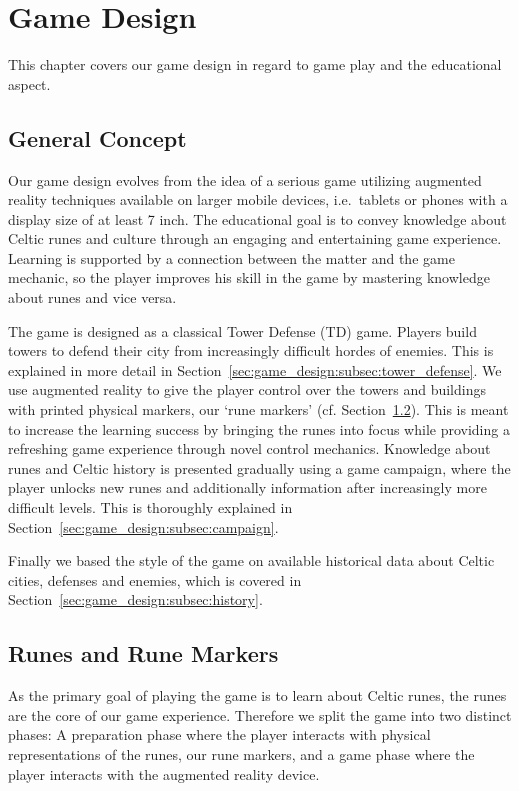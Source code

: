 \section{Game Design}
\label{sec:game_design}

This chapter covers our game design in regard to game play and the educational aspect.

\subsection{General Concept}
\label{sec:game_design:subsec:general_concept}

Our game design evolves from the idea of a serious game utilizing augmented reality techniques available on larger mobile devices, i.e.\ tablets or phones with a display size of at least 7 inch.
The educational goal is to convey knowledge about Celtic runes and culture through an engaging and entertaining game experience.
Learning is supported by a connection between the matter and the game mechanic, so the player improves his skill in the game by mastering knowledge about runes and vice versa.

The game is designed as a classical Tower Defense (TD) game. Players build towers to defend their city from increasingly difficult hordes of enemies.
This is explained in more detail in Section~\ref{sec:game_design:subsec:tower_defense}.
We use augmented reality to give the player control over the towers and buildings with printed physical markers, our `rune markers' (cf. Section~\ref{sec:game_design:subsec:runes}).
This is meant to increase the learning success by bringing the runes into focus while providing a refreshing game experience through novel control mechanics.
Knowledge about runes and Celtic history is presented gradually using a game campaign, where the player unlocks new runes and additionally information after increasingly more difficult levels. This is thoroughly explained in Section~\ref{sec:game_design:subsec:campaign}.

Finally we based the style of the game on available historical data about Celtic cities, defenses and enemies, which is covered in Section~\ref{sec:game_design:subsec:history}.

\subsection{Runes and Rune Markers}
\label{sec:game_design:subsec:runes}

As the primary goal of playing the game is to learn about Celtic runes, the runes are the core of our game experience.
Therefore we split the game into two distinct phases:
A preparation phase where the player interacts with physical representations of the runes, our rune markers, and a game phase where the player interacts with the augmented reality device.

